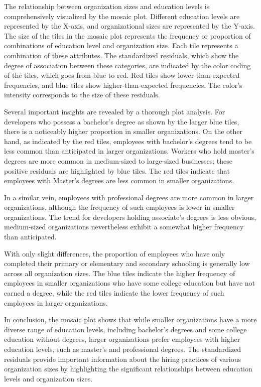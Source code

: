 \documentclass[
  12pt,
]{article}
\begin{document}
The relationship between organization sizes and education levels is
comprehensively visualized by the mosaic plot. Different education
levels are represented by the X-axis, and organizational sizes are
represented by the Y-axis. The size of the tiles in the mosaic plot
represents the frequency or proportion of combinations of education
level and organization size. Each tile represents a combination of these
attributes. The standardized residuals, which show the degree of
association between these categories, are indicated by the color coding
of the tiles, which goes from blue to red. Red tiles show
lower-than-expected frequencies, and blue tiles show
higher-than-expected frequencies. The color's intensity corresponds to
the size of these residuals.

Several important insights are revealed by a thorough plot analysis. For
developers who possess a bachelor's degree as shown by the larger blue
tiles, there is a noticeably higher proportion in smaller organizations.
On the other hand, as indicated by the red tiles, employees with
bachelor's degrees tend to be less common than anticipated in larger
organizations. Workers who hold master's degrees are more common in
medium-sized to large-sized businesses; these positive residuals are
highlighted by blue tiles. The red tiles indicate that employees with
Master's degrees are less common in smaller organizations.

In a similar vein, employees with professional degrees are more common
in larger organizations, although the frequency of such employees is
lower in smaller organizations. The trend for developers holding
associate's degrees is less obvious, medium-sized organizations
nevertheless exhibit a somewhat higher frequency than anticipated.

With only slight differences, the proportion of employees who have only
completed their primary or elementary and secondary schooling is
generally low across all organization sizes. The blue tiles indicate the
higher frequency of employees in smaller organizations who have some
college education but have not earned a degree, while the red tiles
indicate the lower frequency of such employees in larger organizations.

In conclusion, the mosaic plot shows that while smaller organizations
have a more diverse range of education levels, including bachelor's
degrees and some college education without degrees, larger organizations
prefer employees with higher education levels, such as master's and
professional degrees. The standardized residuals provide important
information about the hiring practices of various organization sizes by
highlighting the significant relationships between education levels and
organization sizes.
\end{document}
